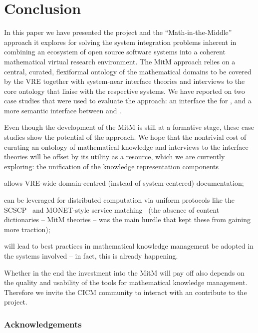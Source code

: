 \section{Conclusion}\label{sec:concl}
In this paper we have presented the \ODK project and the ``Math-in-the-Middle'' approach
it explores for solving the system integration problems inherent in combining an ecosystem
of open source software systems into a coherent mathematical virtual research environment.
The MitM approach relies on a central, curated, flexiformal ontology of the mathematical
domains to be covered by the VRE together with system-near interface theories and
interviews to the core ontology that liaise with the respective systems. We have reported
on two case studies that were used to evaluate the approach: an interface the for \LMFDB,
and a more semantic interface between \GAP and \Sage. 

Even though the development of the MitM is still at a formative stage, these case studies
show the potential of the approach. We hope that the nontrivial cost of curating an
ontology of mathematical knowledge and interviews to the interface theories will be offset
by its utility as a resource, which we are currently exploring: the unification of the
knowledge representation components
\begin{compactitem}
\item allows VRE-wide domain-centred (instead of system-centered) documentation;
\item can be leveraged for distributed computation via uniform protocols like the
  SCSCP~\cite{HorRoz:ossp09} and MONET-style service
  matching~\cite{CaprottiEtAl:MathServiceMatching04:tr} (the absence of content
  dictionaries -- MitM theories -- was the main hurdle that kept these from gaining more
  traction);
\item will lead to best practices in mathematical knowledge management be adopted in the
  systems involved -- in fact, this is already happening.
\end{compactitem}
Whether in the end the investment into the MitM will pay off also depends on the quality
and usability of the tools for mathematical knowledge management. Therefore we invite the
CICM community to interact with an contribute to the \ODK project. 

\subsubsection*{Acknowledgements}


